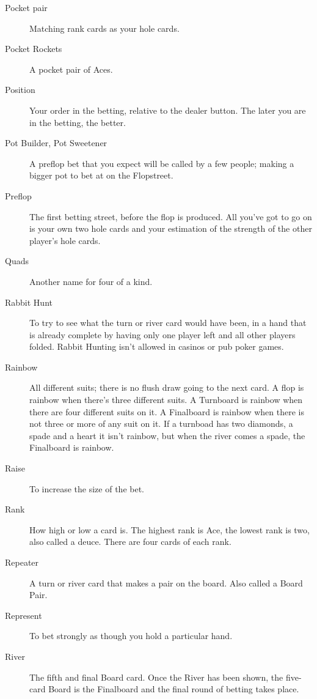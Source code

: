 \begin{description}
\item[Pocket pair] Matching rank cards as your hole cards.

\item[Pocket Rockets] A pocket pair of Aces.

\item[Position] Your order in the betting, relative to the dealer
button. The later you are in the betting, the better.

\item[Pot Builder, Pot Sweetener] A preflop bet that you expect will
be called by a few people; making a bigger pot to bet at on the
Flopstreet.

\item[Preflop] The first betting street, before the flop is produced.
All you've got to go on is your own two hole cards and your estimation
of the strength of the other player's hole cards.

\item[Quads] Another name for four of a kind.

\item[Rabbit Hunt] To try to see what the turn or river card would
have been, in a hand that is already complete by having only one
player left and all other players folded. Rabbit Hunting isn't allowed
in casinos or pub poker games.

\item[Rainbow] All different suits; there is no flush
draw going to the next card. A flop is rainbow when there's three
different suits. A Turnboard is rainbow when there are four different
suits on it. A Finalboard is rainbow when there is not
three or more of any suit on it. If a turnboad has two diamonds, a
spade and a heart it isn't rainbow, but when the river comes a spade,
the Finalboard is rainbow.

\item[Raise] To increase the size of the bet.

\item[Rank] How high or low a card is. The highest rank is Ace, the
lowest rank is two, also called a deuce. There are four cards of
each rank.

\item[Repeater] A turn or river card that makes a pair on the
board. Also called a Board Pair.

\item[Represent] To bet strongly as though you hold a particular hand.

\item[River] The fifth and final Board card. Once the River has been
shown, the five-card Board is the Finalboard and the final round of
betting takes place.


\end{description}
